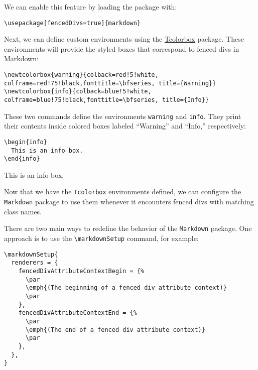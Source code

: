 \documentclass[]{article}
\begin{document}
We can enable this feature by loading the package with:

\begin{verbatim}
\usepackage[fencedDivs=true]{markdown}
\end{verbatim}

Next, we can define custom environments using the
\href{https://ctan.org/pkg/tcolorbox?lang=en}{Tcolorbox} package. These
environments will provide the styled boxes that correspond to fenced divs in
Markdown:

\begin{verbatim}
\newtcolorbox{warning}{colback=red!5!white, colframe=red!75!black,fonttitle=\bfseries, title={Warning}}
\newtcolorbox{info}{colback=blue!5!white, colframe=blue!75!black,fonttitle=\bfseries, title={Info}}
\end{verbatim}

These two commands define the environments \texttt{warning} and \texttt{info}.  
They print their contents inside colored boxes labeled “Warning” and “Info,” respectively:

\begin{verbatim}
\begin{info}
  This is an info box.
\end{info}
\end{verbatim}

\begin{info}
  This is an info box.
\end{info}

Now that we have the \texttt{Tcolorbox} environments defined, we can configure the \texttt{Markdown} package to use them whenever it encounters fenced divs with matching class names.  



There are two main ways to redefine the behavior of the \texttt{Markdown} package.  
One approach is to use the \verb|\markdownSetup| command, for example:
\begin{verbatim}
\markdownSetup{
  renderers = {
    fencedDivAttributeContextBegin = {%
      \par
      \emph{(The beginning of a fenced div attribute context)}
      \par
    },
    fencedDivAttributeContextEnd = {%
      \par
      \emph{(The end of a fenced div attribute context)}
      \par
    },
  },
}
\end{verbatim}
\end{document}
